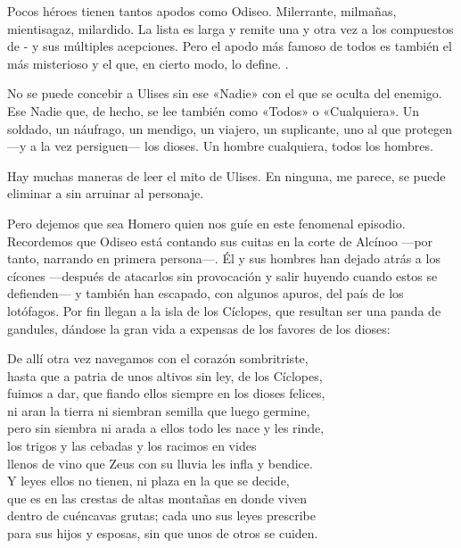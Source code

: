 \label{cap:ciclope}

Pocos héroes tienen tantos apodos como Odiseo. Milerrante, milmañas, mientisagaz, milardido. La lista es larga y remite una y otra vez a los compuestos de - y sus múltiples acepciones. Pero el apodo más famoso de todos es también el más misterioso y el que, en cierto modo, lo define. .

No se puede concebir a Ulises sin ese «Nadie» con el que se oculta del enemigo. Ese Nadie que, de hecho, se lee también como «Todos» o «Cualquiera». Un soldado, un náufrago, un mendigo, un viajero, un suplicante, uno al que protegen ---y a la vez persiguen--- los dioses. Un hombre cualquiera, todos los hombres.

Hay muchas maneras de leer el mito de Ulises. En ninguna, me parece, se puede eliminar a  sin arruinar al personaje.

Pero dejemos que sea Homero quien nos guíe en este fenomenal episodio. Recordemos que Odiseo está contando sus cuitas en la corte de Alcínoo ---por tanto, narrando en primera persona---. Él y sus hombres han dejado atrás a los cícones ---después de atacarlos sin provocación y salir huyendo cuando estos se defienden--- y también han escapado, con algunos apuros, del país de los lotófagos. Por fin llegan a la isla de los Cíclopes, que resultan ser una panda de gandules, dándose la gran vida a expensas de los favores de los dioses:

\begin{versocita}
De allí otra vez navegamos con el corazón sombritriste,\\
hasta que a patria de unos altivos sin ley, de los Cíclopes,\\
fuimos a dar, que fiando ellos siempre en los dioses felices,\\
ni aran la tierra ni siembran semilla que luego germine,\\
pero sin siembra ni arada a ellos todo les nace y les rinde,\\
los trigos y las cebadas y los racimos en vides\\
llenos de vino que Zeus con su lluvia les infla y bendice.\\
Y leyes ellos no tienen, ni plaza en la que se decide,\\
que es en las crestas de altas montañas en donde viven\\
dentro de cuéncavas grutas; cada uno sus leyes prescribe\\
para sus hijos y esposas, sin que unos de otros se cuiden.
\end{versocita}


